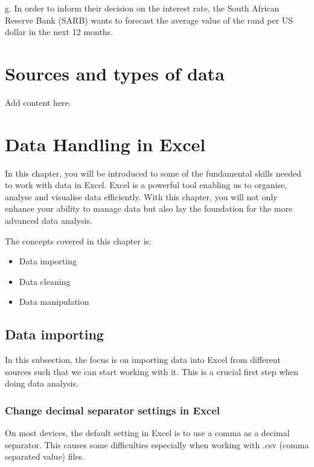 \documentclass[
]{book}
\begin{document}
g. In order to inform their decision on the interest rate, the South African Reserve Bank (SARB) wants to forecast the average value of the rand per US dollar in the next 12 months.

\chapter{Sources and types of data}\label{ch2}

Add content here.

\chapter{Data Handling in Excel}\label{ch3}

In this chapter, you will be introduced to some of the fundamental skills needed to work with data in Excel. Excel is a powerful tool enabling us to organise, analyse and visualise data efficiently. With this chapter, you will not only enhance your ability to manage data but also lay the foundation for the more advanced data analysis.

The concepts covered in this chapter is:

\begin{itemize}
\item
  Data importing
\item
  Data cleaning
\item
  Data manipulation
\end{itemize}

\section{Data importing}\label{data-importing}

In this subsection, the focus is on importing data into Excel from different sources such that we can start working with it. This is a crucial first step when doing data analysis.

\subsection{Change decimal separator settings in Excel}\label{change-decimal-separator-settings-in-excel}

On most devices, the default setting in Excel is to use a comma as a decimal separator. This causes some difficulties especially when working with .csv (comma separated value) files.

\newpage
\end{document}

